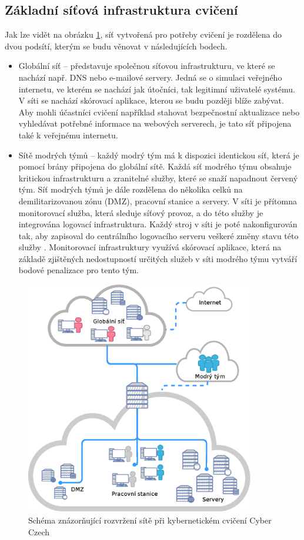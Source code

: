 \documentclass[
  digital, %
  twoside, %
  table,   %
  lof,     %
  lot,     %
]{fithesis3}
\begin{document}
\subsection{Základní síťová infrastruktura cvičení}
Jak lze vidět na obrázku \ref{fig:kypoNetwork}, síť vytvořená pro potřeby cvičení je rozdělena do dvou podsítí, kterým se budu věnovat v následujících bodech.

\begin{itemize}
    \item Globální síť -- představuje společnou síťovou infrastrukturu, ve které se nachází např. DNS nebo e-mailové servery. Jedná se o simulaci veřejného internetu, ve kterém se nachází jak útočníci, tak legitimní uživatelé systému. V síti se nachází skórovací aplikace, kterou se budu později blíže zabývat. Aby mohli účastníci cvičení například stahovat bezpečnostní aktualizace nebo vyhledávat potřebné informace na webových serverech, je tato síť připojena také k veřejnému internetu.
    \item Sítě modrých týmů -- každý modrý tým má k dispozici identickou síť, která je pomocí brány připojena do globální sítě. Každá síť modrého týmu obsahuje kritickou infrastrukturu a zranitelné služby, které se snaží napadnout červený tým. Síť modrých týmů je dále rozdělena do několika celků na demilitarizovanou zónu (DMZ), pracovní stanice a servery. V síti je přítomna monitorovací služba, která sleduje síťový provoz, a do této služby je integrována logovací infrastruktura. Každý stroj v síti je poté nakonfigurován tak, aby zapisoval do centrálního logovacího serveru veškeré změny stavu této služby \cite{CeledaKYPO-AExercises}. Monitorovací infrastruktury využívá skórovací aplikace, která na základě zjištěných nedostupností určitých služeb v síti modrého týmu vytváří bodové penalizace pro tento tým.
\end{itemize}

\begin{figure}[h]
    \centering
    \includegraphics[width=10cm]{images/kypo-network.eps}
    \caption{Schéma znázorňující rozvržení sítě při kybernetickém cvičení Cyber Czech \cite{Vykopal2017LessonsRange}}
    \label{fig:kypoNetwork}
\end{figure}
\end{document}
